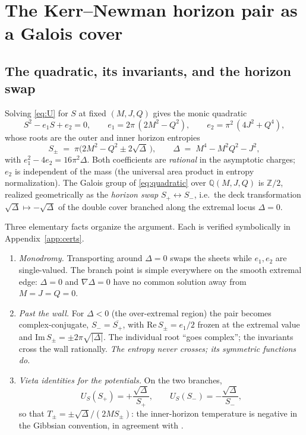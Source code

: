 \documentclass[11pt]{article}
\theoremstyle{definition}
\theoremstyle{remark}
\newcommand{\Q}{\mathbb{Q}}
\newcommand{\ZZ}{\mathbb{Z}}
\newcommand{\disc}{\Delta}
\begin{document}
\section{The Kerr--Newman horizon pair as a Galois cover}
\label{sec:KN}

\subsection{The quadratic, its invariants, and the horizon swap}

Solving \eqref{eq:U} for $S$ at fixed $(M,J,Q)$ gives the monic quadratic
\begin{equation}
S^2 - e_1 S + e_2 = 0,\qquad
e_1 = 2\pi\,(2M^2-Q^2),\qquad
e_2 = \pi^2\,(4J^2+Q^4),
\label{eq:quadratic}
\end{equation}
whose roots are the outer and inner horizon entropies
\begin{equation}
S_\pm \;=\; \pi\bigl(2M^2-Q^2 \pm 2\sqrt{\disc}\,\bigr),
\qquad \disc \;=\; M^4 - M^2Q^2 - J^2 ,
\end{equation}
with $e_1^2-4e_2 = 16\pi^2\disc$. Both coefficients are \emph{rational} in the
asymptotic charges; $e_2$ is independent of the mass (the universal area
product \cite{AH,CGP2011} in entropy normalization). The Galois group of
\eqref{eq:quadratic} over $\Q(M,J,Q)$ is $\ZZ/2$, realized geometrically as the
\emph{horizon swap} $S_+\leftrightarrow S_-$, i.e.\ the deck transformation
$\sqrt{\disc}\mapsto-\sqrt{\disc}$ of the double cover branched along the
extremal locus $\disc=0$.

Three elementary facts organize the argument.  Each is verified symbolically
in Appendix~\ref{app:certs}.
\begin{enumerate}
\item \emph{Monodromy.} Transporting around $\disc=0$ swaps the sheets while
$e_1,e_2$ are single-valued. The branch point is simple everywhere on the
smooth extremal edge: $\disc=0$ and $\nabla\disc=0$ have no common solution
away from $M=J=Q=0$.
\item \emph{Past the wall.} For $\disc<0$ (the over-extremal region) the pair
becomes complex-conjugate, $S_-=\overline{S_+}$, with
$\mathrm{Re}\,S_\pm=e_1/2$ frozen at the extremal value and
$\mathrm{Im}\,S_\pm=\pm 2\pi\sqrt{|\disc|}$. The individual root
``goes complex''; the invariants cross the wall rationally. \emph{The entropy
never crosses; its symmetric functions do.}
\item \emph{Vieta identities for the potentials.} On the two branches,
\begin{equation}
U_S(S_+)=+\frac{\sqrt\disc}{S_+},\qquad
U_S(S_-)=-\frac{\sqrt\disc}{S_-},
\end{equation}
so that $T_\pm = \pm\sqrt{\disc}/(2MS_\pm)$: the inner-horizon temperature is
negative in the Gibbsian convention, in agreement with \cite{CGLP2018}.
\end{enumerate}
\end{document}
